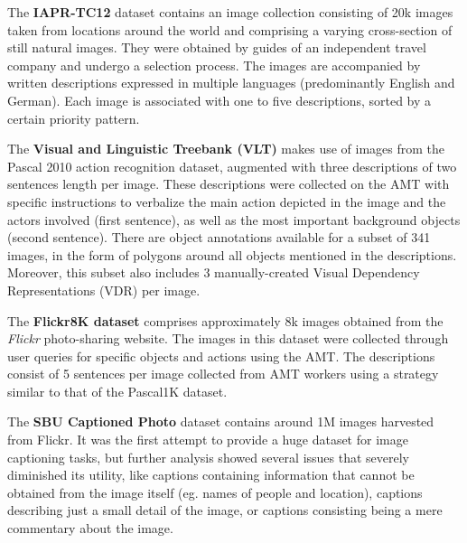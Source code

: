 The \textbf{IAPR-TC12} dataset \citep{Escalante2010} contains an image collection consisting of 20k images taken from locations around the world and comprising a varying cross-section of still natural images. They were obtained by guides of an independent travel company and undergo a selection process. The images are accompanied by written descriptions expressed in multiple languages (predominantly English and German). Each image is associated with one to five descriptions, sorted by a certain priority pattern.

The \textbf{Visual and Linguistic Treebank (VLT)}  \citep{Elliott2013} makes use of images from the Pascal 2010 action recognition dataset, augmented with three descriptions of two sentences length per image. These descriptions were collected on the AMT with specific instructions to verbalize the main action depicted in the image and the actors involved (first sentence), as well as the most important background objects (second sentence). There are object annotations available for a subset of 341 images, in the form of polygons around all objects mentioned in the descriptions. Moreover, this subset also includes 3 manually-created Visual Dependency Representations (VDR) per image. 

The \textbf{Flickr8K dataset} \citep{Rashtchian2010} comprises approximately 8k images obtained from the \textit{Flickr} photo-sharing website. The images in this dataset were collected through user queries for specific objects and actions using the AMT. The descriptions consist of 5 sentences per image collected from AMT workers using a strategy similar to that of the Pascal1K dataset. 

The \textbf{SBU Captioned Photo} dataset \citep{Ordonez2011} contains around 1M images harvested from Flickr. It was the first attempt to provide a huge dataset for image captioning tasks, but further analysis showed several issues that severely diminished its utility, like captions containing information that cannot be obtained from the image itself (eg. names of people and location), captions describing just a small detail of the image, or captions consisting being a mere commentary about the image.

